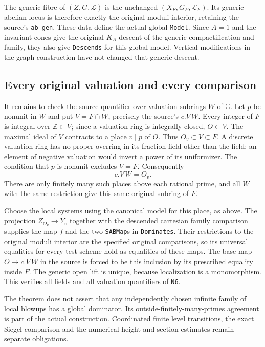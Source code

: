 The generic fibre of $(Z,G,\mathscr L)$ is the unchanged
$(X_F,G_F,\mathscr L_F)$.  Its generic abelian locus is
therefore exactly the original moduli interior, retaining the
source's \texttt{ab\_gen}.  These data define the actual
global \texttt{Model}.  Since $A=1$ and the invariant cones
give the original $K_A$-descent of the generic compactification
and family, they also give \texttt{Descends} for this global
model.  Vertical modifications in the graph construction have
not changed that generic descent.

\subsection*{Every original valuation and every comparison}

It remains to check the source quantifier over valuation subrings
$W$ of $\mathbb C$.  Let $p$ be nonunit in $W$ and put
$V=F\cap W$, precisely the source's $c.V\,W$.
Every integer of $F$ is integral over $\mathbb Z\subset V$;
since a valuation ring is integrally closed, $O\subset V$.
The maximal ideal of $V$ contracts to a place $v\mid p$ of $O$.
Thus $O_v\subset V\subset F$.  A discrete valuation ring has
no proper overring in its fraction field other than the field:
an element of negative valuation would invert a power of its
uniformizer.  The condition that $p$ is nonunit excludes $V=F$.
Consequently
\[
                              c.V\,W=O_v.
\]
There are only finitely many such places above each rational
prime, and all $W$ with the same restriction give this same
original subring of $F$.

Choose the local systems using the canonical model for this
place, as above.  The projection $Z_{O_v}\to Y_v$ together
with the descended cartesian family comparison supplies the
map $f$ and the two \texttt{SABMap}s in \texttt{Dominates}.
Their restrictions to the original moduli interior are the
specified original comparisons, so its universal equalities
for every test scheme hold as equalities of these maps.
The base map $O\to c.V\,W$ in the source is forced to be this
inclusion by its prescribed equality inside $F$.  The generic
open lift is unique, because localization is a monomorphism.
This verifies all fields and all valuation quantifiers of
\texttt{N6}\cite{global-model-source}.

The theorem does not assert that any independently chosen
infinite family of local blowups has a global dominator.
Its outside-finitely-many-primes agreement is part of the
actual construction.  Coordinated finite level transitions,
the exact Siegel comparison and the numerical height and
section estimates remain separate obligations.
